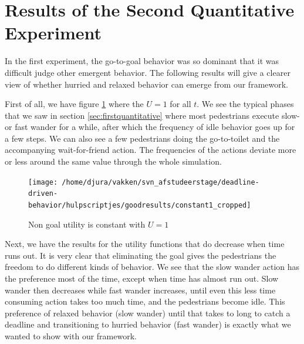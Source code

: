 \documentclass[11pt]{book}
\begin{document}


\clearpage

\section{Results of the Second Quantitative Experiment}
\label{sec:secondquantitativeexperimentresults}
In the first experiment, the go-to-goal behavior was so dominant that it was difficult judge other emergent behavior. The following results will give a clearer view of whether hurried and relaxed behavior can emerge from our framework.

First of all, we have figure \ref{fig:constant1} where the $U=1$ for all $t$. We see the typical phases that we saw in section \ref{sec:firstquantitative} where most pedestrians execute slow- or fast wander for a while, after which the frequency of idle behavior goes up for a few steps. We can also see a few pedestrians doing the go-to-toilet and the accompanying wait-for-friend action. The frequencies of the actions deviate more or less around the same value through the whole simulation.

\begin{figure}
\centering
\texttt{[image: /home/djura/vakken/svn\_afstudeerstage/deadline-driven-behavior/hulpscriptjes/goodresults/constant1\_cropped]}
\caption{Non goal utility is constant with $U=1$}
\label{fig:constant1}
\end{figure}

Next, we have the results for the utility functions that do decrease when time runs out. It is very clear that eliminating the goal gives the pedestrians the freedom to do different kinds of behavior. We see that the slow wander action has the preference most of the time, except when time has almost run out. Slow wander then decreases while fast wander increases, until even this less time consuming action takes too much time, and the pedestrians become idle. This preference of relaxed behavior (slow wander) until that takes to long to catch a deadline and transitioning to hurried behavior (fast wander) is exactly what we wanted to show with our framework.
\end{document}
